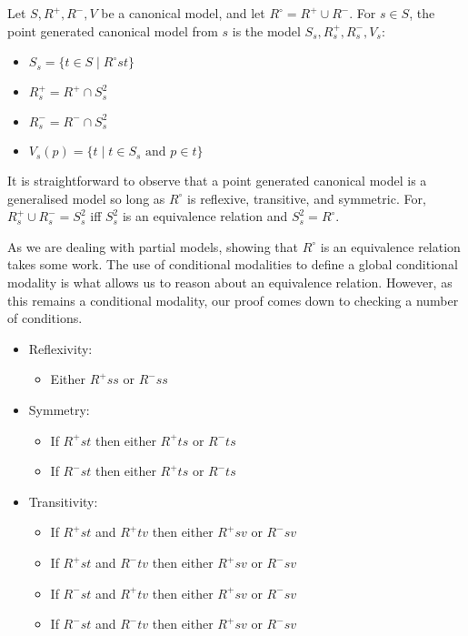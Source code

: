 \documentclass[10pt]{article}
\begin{document}
\begin{definition}
  Let \(S, R^{+}, R^{-}, V\) be a canonical model, and let \(R^{\circ} = R^{+} \cup R^{-}\).
  For \(s \in S\), the point generated canonical model from \(s\) is the model \(S_{s}, R^{+}_{s}, R^{-}_{s}, V_{s}\):
  \begin{itemize}
  \item \(S_{s} = \{ t \in S \mid R^{\circ}st \}\)
  \item \(R^{+}_{s} = R^{+} \cap S_{s}^{2}\)
  \item \(R^{-}_{s} = R^{-} \cap S_{s}^{2}\)
  \item \(V_{s}(p) = \{t \mid t \in S_{s} \text{ and } p \in t\}\)
  \end{itemize}
\end{definition}

It is straightforward to observe that a point generated canonical model is a generalised model so long as \(R^{\circ}\) is reflexive, transitive, and symmetric.
For, \(R^{+}_{s} \cup R^{-}_{s} = S^{2}_{s}\) iff \(S^{2}_{s}\) is an equivalence relation and \(S_{s}^{2} = R^{\circ}\).

As we are dealing with partial models, showing that \(R^{\circ}\) is an equivalence relation takes some work.
The use of conditional modalities to define a global conditional modality is what allows us to reason about an equivalence relation.
However, as this remains a conditional modality, our proof comes down to checking a number of conditions.

\begin{itemize}
\item Reflexivity:
  \begin{itemize}
  \item Either \(R^{+}ss\) or \(R^{-}ss\)
  \end{itemize}
\item Symmetry:
  \begin{itemize}
  \item If \(R^{+}st\) then either \(R^{+}ts\) or \(R^{-}ts\)
  \item If \(R^{-}st\) then either \(R^{+}ts\) or \(R^{-}ts\)
  \end{itemize}
\item Transitivity:
  \begin{itemize}
  \item If \(R^{+}st\) and \(R^{+}tv\) then either \(R^{+}sv\) or \(R^{-}sv\)
  \item If \(R^{+}st\) and \(R^{-}tv\) then either \(R^{+}sv\) or \(R^{-}sv\)
  \item If \(R^{-}st\) and \(R^{+}tv\) then either \(R^{+}sv\) or \(R^{-}sv\)
  \item If \(R^{-}st\) and \(R^{-}tv\) then either \(R^{+}sv\) or \(R^{-}sv\)
  \end{itemize}
\end{itemize}
\end{document}
